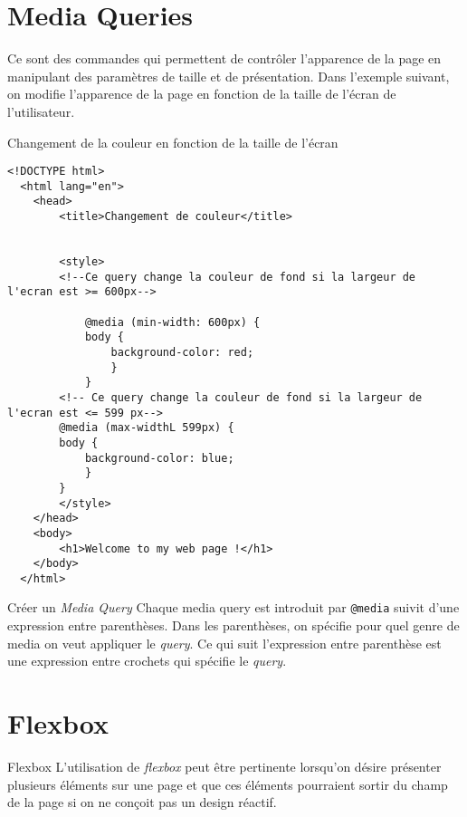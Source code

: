 \documentclass{report}
\begin{document}
\section{Media Queries}
\noindent Ce sont des commandes qui permettent de contrôler l'apparence de la page en manipulant des paramètres de 
taille et de présentation. Dans l'exemple suivant, on modifie l'apparence de la page en fonction de la taille de 
l'écran de l'utilisateur. 


\begin{ExampleDdHTML*}{Changement de la couleur en fonction de la taille de l'écran}{}
\begin{lstlisting}[style=HTMLDraculaDark]  
  <!DOCTYPE html>
  <html lang="en">
	<head>
		<title>Changement de couleur</title>

		
		<style>
		<!--Ce query change la couleur de fond si la largeur de l'ecran est >= 600px-->
	
			@media (min-width: 600px) {
			body {
				background-color: red;
				}
			}
		<!-- Ce query change la couleur de fond si la largeur de l'ecran est <= 599 px-->
		@media (max-widthL 599px) {
		body {
			background-color: blue;
			}
		}
		</style>
	</head>
	<body>
		<h1>Welcome to my web page !</h1>
	</body>
  </html>
\end{lstlisting}
\end{ExampleDdHTML*}

\begin{Remarque*}{Créer un \textit{Media Query}}{}
Chaque media query est introduit par \texttt{\footnotesize{@media}} suivit d'une expression entre parenthèses. Dans
les parenthèses, on spécifie pour quel genre de media on veut appliquer le \textit{query}. Ce qui suit l'expression
entre parenthèse est une expression entre crochets qui spécifie le \textit{query}. 
\end{Remarque*}





\section{Flexbox}
\begin{Syntaxe*}{Flexbox}{}
L'utilisation de \textit{flexbox} peut être pertinente lorsqu'on désire présenter plusieurs éléments 
sur une page et que ces éléments pourraient sortir du champ de la page si on ne conçoit pas un design réactif. 
\end{Syntaxe*}
\end{document}
